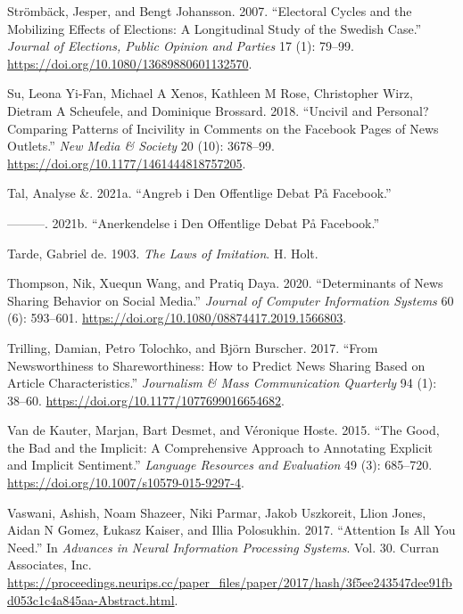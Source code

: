 \documentclass[
]{article}
\newlength{\cslhangindent}
\newlength{\cslentryspacingunit} %
\newenvironment{CSLReferences}[2] %
 {%
  \setlength{\parindent}{0pt}
  \ifodd #1
  \let\oldpar\par
  \def\par{\hangindent=\cslhangindent\oldpar}
  \fi
  \setlength{\parskip}{#2\cslentryspacingunit}
 }%
 {}
\begin{document}
\begin{CSLReferences}{1}{0}
\leavevmode{}%
Strömbäck, Jesper, and Bengt Johansson. 2007. {``Electoral {Cycles} and
the {Mobilizing} {Effects} of {Elections}: {A} {Longitudinal} {Study} of
the {Swedish} {Case}.''} \emph{Journal of Elections, Public Opinion and
Parties} 17 (1): 79--99.
\url{https://doi.org/10.1080/13689880601132570}.

\leavevmode{}%
Su, Leona Yi-Fan, Michael A Xenos, Kathleen M Rose, Christopher Wirz,
Dietram A Scheufele, and Dominique Brossard. 2018. {``Uncivil and
Personal? {Comparing} Patterns of Incivility in Comments on the
{Facebook} Pages of News Outlets.''} \emph{New Media \& Society} 20
(10): 3678--99. \url{https://doi.org/10.1177/1461444818757205}.

\leavevmode{}%
Tal, Analyse \&. 2021a. {``Angreb i Den Offentlige Debat På
{Facebook}.''}

\leavevmode{}%
---------. 2021b. {``Anerkendelse i Den Offentlige Debat På
{Facebook}.''}

\leavevmode{}%
Tarde, Gabriel de. 1903. \emph{The {Laws} of {Imitation}}. H. Holt.

\leavevmode{}%
Thompson, Nik, Xuequn Wang, and Pratiq Daya. 2020. {``Determinants of
{News} {Sharing} {Behavior} on {Social} {Media}.''} \emph{Journal of
Computer Information Systems} 60 (6): 593--601.
\url{https://doi.org/10.1080/08874417.2019.1566803}.

\leavevmode{}%
Trilling, Damian, Petro Tolochko, and Björn Burscher. 2017. {``From
{Newsworthiness} to {Shareworthiness}: {How} to {Predict} {News}
{Sharing} {Based} on {Article} {Characteristics}.''} \emph{Journalism \&
Mass Communication Quarterly} 94 (1): 38--60.
\url{https://doi.org/10.1177/1077699016654682}.

\leavevmode{}%
Van de Kauter, Marjan, Bart Desmet, and Véronique Hoste. 2015. {``The
Good, the Bad and the Implicit: A Comprehensive Approach to Annotating
Explicit and Implicit Sentiment.''} \emph{Language Resources and
Evaluation} 49 (3): 685--720.
\url{https://doi.org/10.1007/s10579-015-9297-4}.

\leavevmode{}%
Vaswani, Ashish, Noam Shazeer, Niki Parmar, Jakob Uszkoreit, Llion
Jones, Aidan N Gomez, Łukasz Kaiser, and Illia Polosukhin. 2017.
{``Attention Is {All} You {Need}.''} In \emph{Advances in {Neural}
{Information} {Processing} {Systems}}. Vol. 30. Curran Associates, Inc.
\url{https://proceedings.neurips.cc/paper_files/paper/2017/hash/3f5ee243547dee91fbd053c1c4a845aa-Abstract.html}.


\end{CSLReferences}
\end{document}
